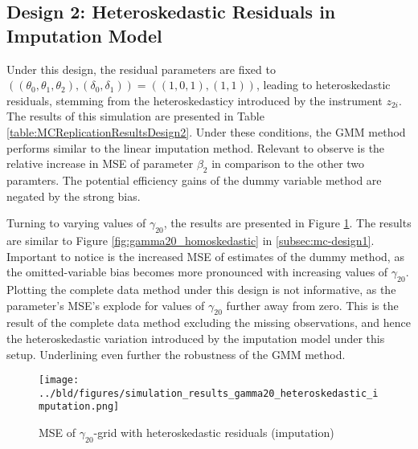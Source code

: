 \subsection{Design 2: Heteroskedastic Residuals in Imputation Model}
Under this design, the residual parameters are fixed to $((\theta_0, \theta_1, \theta_2), (\delta_0, \delta_1)) = ((1, 0, 1), (1, 1))$, leading to heteroskedastic residuals, stemming from the heteroskedasticy introduced by the instrument $z_{2i}$.
The results of this simulation are presented in Table \ref{table:MCReplicationResultsDesign2}.
Under these conditions, the GMM method performs similar to the linear imputation method.
Relevant to observe is the relative increase in MSE of parameter $\beta_2$ in comparison to the other two paramters.
The potential efficiency gains of the dummy variable method are negated by the strong bias.



Turning to varying values of $\gamma_{20}$, the results are presented in Figure \ref{fig:gamma20_heteroskedastic_imputation}.
The results are similar to Figure \ref{fig:gamma20_homoskedastic} in \ref{subsec:mc-design1}.
Important to notice is the increased MSE of estimates of the dummy method, as the omitted-variable bias becomes more pronounced with increasing values of $\gamma_{20}$.
Plotting the complete data method under this design is not informative, as the parameter's MSE's explode for values of $\gamma_{20}$ further away from zero.
This is the result of the complete data method excluding the missing observations, and hence the heteroskedastic variation introduced by the imputation model under this setup.
Underlining even further the robustness of the GMM method.

\begin{figure}[H]
    \centering
    \texttt{[image: ../bld/figures/simulation\_results\_gamma20\_heteroskedastic\_imputation.png]}
    \caption{MSE of $\gamma_{20}$-grid with heteroskedastic residuals (imputation)}
    \label{fig:gamma20_heteroskedastic_imputation}
\end{figure}

